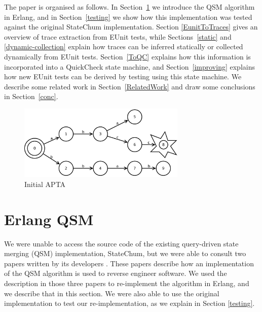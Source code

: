 \documentclass[]{sigplanconf}
\begin{document}
The paper is organised as follows. In Section~\ref{QSM} we introduce the QSM algorithm in Erlang, and in Section~\ref{testing} we show how this implementation was tested against the original StateChum implementation. Section \ref{EunitToTraces} gives an overview of trace extraction from EUnit tests, while Sections~\ref{static} and \ref{dynamic-collection} explain how traces can be inferred statically or collected dynamically from EUnit tests. Section~\ref{ToQC} explains how this information is incorporated into a QuickCheck state machine, and Section~\ref{improving} explains how new EUnit tests can be derived by testing using this state machine. We describe some related work in Section~\ref{RelatedWork} and draw some conclusions in Section~\ref{conc}. 

\begin{figure}
\begin{center}
\includegraphics[width=8cm]{pictures/fsm1.pdf}
\end{center}
\caption{Initial APTA}
\label{fsm1}
\end{figure}



\section{Erlang QSM}
\label{QSM}

We were unable to access the source code of the existing query-driven state merging (QSM) implementation, StateChum, but
we were able to consult two papers written by its developers
\cite{walkinshaw2008inferring,walkinshaw2007reverse}.
These papers describe how an implementation of
the QSM algorithm \cite{dupont2008qsm} is used to reverse engineer software.
We used the description in those three papers to re-implement the
algorithm in Erlang, and we describe that in this section. We were also able to use the original implementation to test our re-implementation, as we explain in  Section \ref{testing}.
\end{document}
